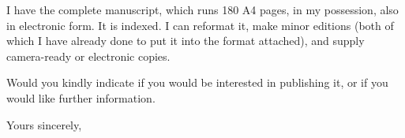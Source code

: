 \documentclass[a4paper,11pt]{letter}
\begin{document}
\begin{letter}
I have the complete manuscript, which runs 180 A4 pages, in my
possession, also in electronic form.  It is indexed.  I can reformat
it, make minor editions (both of which I have already done to put it
into the format attached), and supply camera-ready or electronic
copies.

Would you kindly indicate if you would be interested in publishing it,
or if you would like further information.

\closing{Yours sincerely,}
\end{letter}
\end{document}
